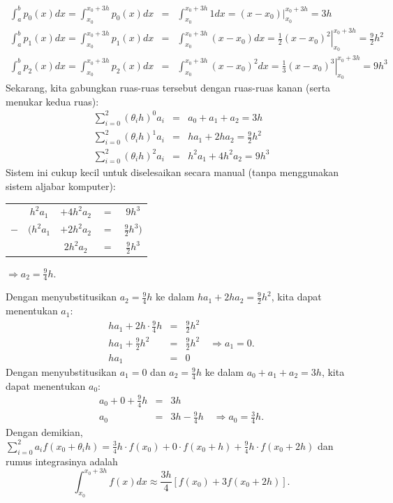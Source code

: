 \begin{description}
\begin{eqnarray*}
\int_{a}^{b}p_{0}(x)dx=\int_{x_{0}}^{x_{0}+3h}p_{0}(x)dx & = & \int_{x_{0}}^{x_{0}+3h}1dx=\left.(x-x_{0})\right|_{x_{0}}^{x_{0}+3h}=3h\\
\int_{a}^{b}p_{1}(x)dx=\int_{x_{0}}^{x_{0}+3h}p_{1}(x)dx & = & \int_{x_{0}}^{x_{0}+3h}(x-x_{0})dx=\left.\frac{1}{2}(x-x_{0})^{2}\right|_{x_{0}}^{x_{0}+3h}=\frac{9}{2}h^{2}\\
\int_{a}^{b}p_{2}(x)dx=\int_{x_{0}}^{x_{0}+3h}p_{2}(x)dx & = & \int_{x_{0}}^{x_{0}+3h}(x-x_{0})^{2}dx=\left.\frac{1}{3}(x-x_{0})^{3}\right|_{x_{0}}^{x_{0}+3h}=9h^{3}
\end{eqnarray*}
Sekarang, kita gabungkan ruas-ruas tersebut dengan ruas-ruas kanan
(serta menukar kedua ruas):
\begin{eqnarray*}
\sum_{i=0}^{2}(\theta_{i}h)^{0}a_{i} & = & a_{0}+a_{1}+a_{2}=3h\\
\sum_{i=0}^{2}(\theta_{i}h)^{1}a_{i} & = & ha_{1}+2ha_{2}=\frac{9}{2}h^{2}\\
\sum_{i=0}^{2}(\theta_{i}h)^{2}a_{i} & = & h^{2}a_{1}+4h^{2}a_{2}=9h^{3}
\end{eqnarray*}
Sistem ini cukup kecil untuk diselesaikan secara manual (tanpa menggunakan
sistem aljabar komputer):

\begin{center}
\begin{tabular}{ccccc}
 & $h^{2}a_{1}$ & $+4h^{2}a_{2}$ & $=$ & $9h^{3}$\tabularnewline
$-$ & $(h^{2}a_{1}$ & $+2h^{2}a_{2}$ & $=$ & $\frac{9}{2}h^{3})$\tabularnewline
\hline 
 &  & $2h^{2}a_{2}$ & $=$ & $\frac{9}{2}h^{3}$\tabularnewline
\end{tabular}$\Rightarrow a_{2}=\frac{9}{4}h$.
\par\end{center}

\noindent Dengan menyubstitusikan $a_{2}=\frac{9}{4}h$ ke dalam $ha_{1}+2ha_{2}=\frac{9}{2}h^{2}$,
kita dapat menentukan $a_{1}$:
\begin{eqnarray*}
ha_{1}+2h\cdot\frac{9}{4}h & = & \frac{9}{2}h^{2}\\
ha_{1}+\frac{9}{2}h^{2} & = & \frac{9}{2}h^{2}\quad\Rightarrow a_{1}=0.\\
ha_{1} & = & 0
\end{eqnarray*}
Dengan menyubstitusikan $a_{1}=0$ dan $a_{2}=\frac{9}{4}h$ ke dalam
$a_{0}+a_{1}+a_{2}=3h$, kita dapat menentukan $a_{0}$:
\begin{eqnarray*}
a_{0}+0+\frac{9}{4}h & = & 3h\\
a_{0} & = & 3h-\frac{9}{4}h\quad\Rightarrow a_{0}=\frac{3}{4}h.
\end{eqnarray*}
Dengan demikian, $\sum_{i=0}^{2}a_{i}f(x_{0}+\theta_{i}h)=\frac{3}{4}h\cdot f(x_{0})+0\cdot f(x_{0}+h)+\frac{9}{4}h\cdot f(x_{0}+2h)$
dan rumus integrasinya adalah
\[
\int_{x_{0}}^{x_{0}+3h}f(x)dx\approx\frac{3h}{4}\left[f(x_{0})+3f(x_{0}+2h)\right].
\]


\end{description}
